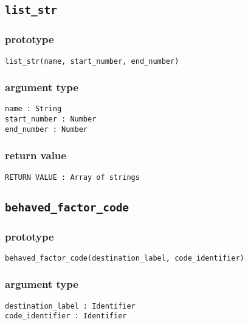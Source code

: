 \documentclass{article}
\begin{document}
\subsection{\texttt{list_str}}
\subsubsection*{prototype}
\begin{lstlisting}
list_str(name, start_number, end_number)
\end{lstlisting}
\subsubsection*{argument type}
\texttt{name : String}\\
\texttt{start_number : Number}\\
\texttt{end_number : Number}
\subsubsection*{return value}
\texttt{RETURN VALUE : Array of strings}

\subsection{\texttt{behaved_factor_code}}
\subsubsection*{prototype}
\begin{lstlisting}
behaved_factor_code(destination_label, code_identifier)
\end{lstlisting}
\subsubsection*{argument type}
\texttt{destination_label : Identifier}\\
\texttt{code_identifier : Identifier}
\end{document}
